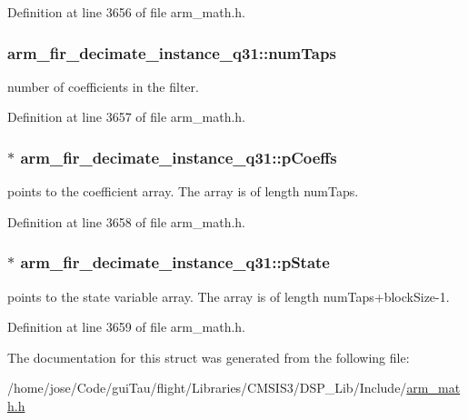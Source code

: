 Definition at line 3656 of file arm\-\_\-math.\-h.

\hypertarget{structarm__fir__decimate__instance__q31_a37915d42b0dc5e3057ebe83110798482}{
\subsubsection[{num\-Taps}]{ arm\-\_\-fir\-\_\-decimate\-\_\-instance\-\_\-q31\-::num\-Taps}}\label{structarm__fir__decimate__instance__q31_a37915d42b0dc5e3057ebe83110798482}
number of coefficients in the filter. 

Definition at line 3657 of file arm\-\_\-math.\-h.

\hypertarget{structarm__fir__decimate__instance__q31_a030d0391538c2481c5b348fd09a952ff}{
\subsubsection[{p\-Coeffs}]{$\ast$ arm\-\_\-fir\-\_\-decimate\-\_\-instance\-\_\-q31\-::p\-Coeffs}}\label{structarm__fir__decimate__instance__q31_a030d0391538c2481c5b348fd09a952ff}
points to the coefficient array. The array is of length num\-Taps. 

Definition at line 3658 of file arm\-\_\-math.\-h.

\hypertarget{structarm__fir__decimate__instance__q31_a0ef0ef9e265f7ab873cfc6daa7593fdb}{
\subsubsection[{p\-State}]{$\ast$ arm\-\_\-fir\-\_\-decimate\-\_\-instance\-\_\-q31\-::p\-State}}\label{structarm__fir__decimate__instance__q31_a0ef0ef9e265f7ab873cfc6daa7593fdb}
points to the state variable array. The array is of length num\-Taps+block\-Size-\/1. 

Definition at line 3659 of file arm\-\_\-math.\-h.



The documentation for this struct was generated from the following file\-:\begin{DoxyCompactItemize}
\item 
/home/jose/\-Code/gui\-Tau/flight/\-Libraries/\-C\-M\-S\-I\-S3/\-D\-S\-P\-\_\-\-Lib/\-Include/\hyperlink{arm__math_8h}{arm\-\_\-math.\-h}\end{DoxyCompactItemize}
